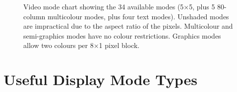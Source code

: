 
\begin{figure}
 \centering
 \caption[Video Modes]{\label{fig:video-modes} Video mode chart showing the 34
   available modes (5×5, plus 5 80-column multicolour modes, plus four text
   modes). Unshaded modes are impractical due to the aspect ratio of the
   pixels. Multicolour and semi-graphics modes have no colour
   restrictions. Graphics modes allow two colours per 8×1 pixel block.}
\end{figure}




\section{Useful Display Mode Types}

